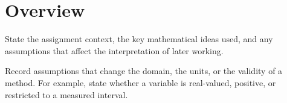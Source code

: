 \section{Overview}

State the assignment context, the key mathematical ideas used, and any
assumptions that affect the interpretation of later working.

\begin{definition}
Record assumptions that change the domain, the units, or the validity of a
method. For example, state whether a variable is real-valued, positive, or
restricted to a measured interval.
\end{definition}
